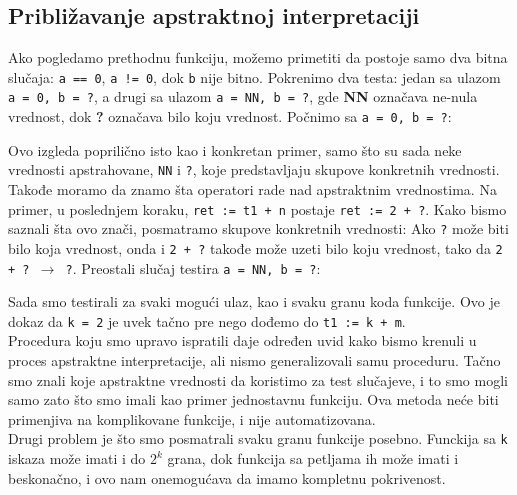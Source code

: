 \subsection{Približavanje apstraktnoj interpretaciji}
\label{subsec:approachingabsint}
Ako pogledamo prethodnu funkciju, možemo primetiti da postoje samo dva bitna slučaja: \texttt{a == 0}, \texttt{a != 0}, dok
\texttt{b} nije bitno. 
Pokrenimo dva testa: jedan sa ulazom \texttt{a = 0, b = ?}, a drugi sa ulazom \texttt{a = NN, b = ?}, gde \textbf{NN} označava ne-nula vrednost, dok \textbf{?} označava bilo koju vrednost. Počnimo sa \texttt{a = 0, b = ?}:

Ovo izgleda poprilično isto kao i konkretan primer, samo što su sada neke vrednosti apstrahovane, \texttt{NN} i \texttt{?},
koje predstavljaju skupove konkretnih vrednosti.
Takođe moramo da znamo šta operatori rade nad apstraktnim vrednostima. Na primer, u poslednjem koraku,
\texttt{ret := t1 + n} postaje \texttt{ret := 2 + ?}. Kako bismo saznali šta ovo znači, posmatramo skupove konkretnih vrednosti: Ako \texttt{?} može biti bilo koja vrednost, onda i \texttt{2 + ?} takođe može uzeti bilo koju vrednost, tako da \texttt{2 + ? $\longrightarrow$ ?}.
Preostali slučaj testira \texttt{a = NN, b = ?}:

Sada smo testirali za svaki mogući ulaz, kao i svaku granu koda funkcije. Ovo je dokaz da \texttt{k = 2} je uvek tačno
pre nego dođemo do \texttt{t1 := k + m}.\\
Procedura koju smo upravo ispratili daje određen uvid kako bismo krenuli u proces apstraktne interpretacije, ali
nismo generalizovali samu proceduru. Tačno smo znali koje apstraktne vrednosti da koristimo za test slučajeve, i to smo mogli
samo zato što smo imali kao primer jednostavnu funkciju. Ova metoda neće biti primenjiva na komplikovane funkcije, i nije
automatizovana.\\
Drugi problem je što smo posmatrali svaku granu funkcije posebno. Funckija sa \texttt{k} iskaza može imati i do
\texttt{$2^k$} grana, dok funkcija sa petljama ih može imati i beskonačno, i ovo nam onemogućava da imamo kompletnu
pokrivenost.


